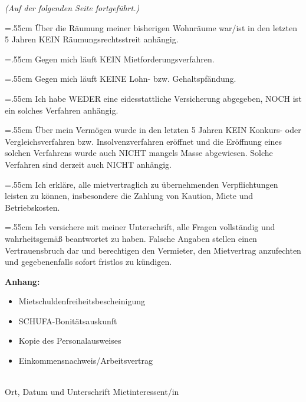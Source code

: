 \documentclass[10pt, a4paper]{letter}
\begin{document}
    \begin{flushright}
    \textit{(Auf der folgenden Seite fortgeführt.)}
    \end{flushright}

    \pagebreak


    \CheckBox[name=räumung]{}
    \hangindent=.55cm Über die Räumung meiner bisherigen Wohnräume war/ist in den letzten 5 Jahren KEIN Räumungsrechtsstreit anhängig.

    \CheckBox[name=mietforderung]{}
    \hangindent=.55cm Gegen mich läuft KEIN Mietforderungsverfahren.

    \CheckBox[name=pfändung]{}
    \hangindent=.55cm Gegen mich läuft KEINE Lohn- bzw. Gehaltspfändung.

    \CheckBox[name=versicherung]{}
    \hangindent=.55cm Ich habe WEDER eine eidesstattliche Versicherung abgegeben, NOCH ist ein solches Verfahren anhängig.

    \CheckBox[name=konkurs]{}
    \hangindent=.55cm Über mein Vermögen wurde in den letzten 5 Jahren KEIN Konkurs- oder Vergleichsverfahren bzw. Insolvenzverfahren eröffnet und die Eröffnung eines solchen Verfahrens wurde auch NICHT mangels Masse abgewiesen. Solche Verfahren sind derzeit auch NICHT anhängig.
    
    \CheckBox[name=verpflichtungen]{}
    \hangindent=.55cm Ich erkläre, alle mietvertraglich zu übernehmenden Verpflichtungen leisten zu können, insbesondere die Zahlung von Kaution, Miete und Betriebskosten.

    \CheckBox[name=wahrheit]{}
    \hangindent=.55cm Ich versichere mit meiner Unterschrift, alle Fragen vollständig und wahrheitsgemäß beantwortet zu haben. Falsche Angaben stellen einen Vertrauensbruch dar und berechtigen den Vermieter, den Mietvertrag anzufechten und gegebenenfalls sofort fristlos zu kündigen.

    \vspace{.4cm}

    \textbf{Anhang:}
    \begin{itemize}
        \item Mietschuldenfreiheitsbescheinigung
        \item SCHUFA-Bonitätsauskunft
        \item Kopie des Personalausweises
        \item Einkommensnachweis/Arbeitsvertrag
    \end{itemize}

    \vspace{.4cm}

    \TextField[name=unterschrift,width=9cm]{}\\
    Ort, Datum und Unterschrift Mietinteressent/in
\end{document}
